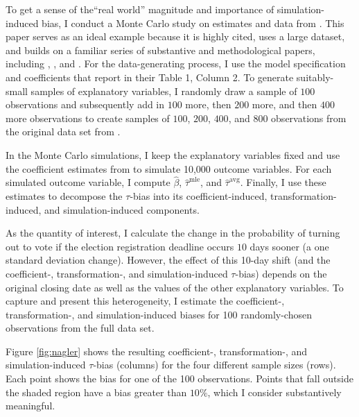 \documentclass[12pt]{article}
\begin{document}
To get a sense of the``real world'' magnitude and importance of simulation-induced bias, I conduct a Monte Carlo study on estimates and data from \cite{BerryDeMerittEsarey2010}. This paper serves as an ideal example because it is highly cited, uses a large dataset, and builds on a familiar series of substantive and methodological papers, including \cite{WolfingerRosenstone1980}, \cite{Nagler1991, Nagler1994}, and \cite{AltmanMcDonald2003}.
For the data-generating process, I use the model specification and coefficients that \cite{BerryDeMerittEsarey2010} report in their Table 1, Column 2. 
To generate suitably-small samples of explanatory variables, I randomly draw a sample of $100$ observations and subsequently add in $100$ more, then $200$ more, and then $400$ more observations to create samples of $100$, $200$, $400$, and $800$ observations from the original data set from \cite{BerryDeMerittEsarey2010}.

In the Monte Carlo simulations, I keep the explanatory variables fixed and use the coefficient estimates from \cite{BerryDeMerittEsarey2010} to simulate 10,000 outcome variables. For each simulated outcome variable, I compute $\hat{\beta}$, $\hat{\tau}^\text{mle}$, and $\hat{\tau}^\text{avg}$. Finally, I use these estimates to decompose the $\tau$-bias into its coefficient-induced, transformation-induced, and simulation-induced components.

As the quantity of interest, I calculate the change in the probability of turning out to vote if the election registration deadline occurs $10$ days sooner (a one standard deviation change). 
However, the effect of this 10-day shift (and the coefficient-, transformation-, and simulation-induced $\tau$-bias) depends on the original closing date as well as the values of the other explanatory variables. To capture and present this heterogeneity, I estimate the coefficient-, transformation-, and simulation-induced biases for 100 randomly-chosen observations from the full data set. 

Figure \ref{fig:nagler} shows the resulting coefficient-, transformation-, and simulation-induced $\tau$-bias (columns) for the four different sample sizes (rows). Each point shows the bias for one of the 100 observations. Points that fall outside the shaded region have a bias greater than $10\%$, which I consider substantively meaningful.
\end{document}
